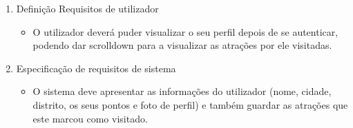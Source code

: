 \begin{enumerate}
    \item Definição Requisitos de utilizador
    \begin{itemize}
        \item O utilizador deverá puder visualizar o seu perfil depois de se autenticar, podendo dar scrolldown para a visualizar as atrações por ele visitadas.
    \end{itemize}
    \item Especificação de requisitos de sistema
    \begin{itemize}
        \item O sistema deve apresentar as informações do utilizador (nome, cidade, distrito, os seus pontos e foto de perfil) e também guardar as atrações que este marcou como visitado.
    \end{itemize}
\end{enumerate}